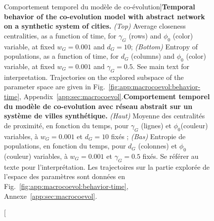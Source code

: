 \begin{figure}
\caption[Temporal behavior of the co-evolution model][Comportement temporel du modèle de co-évolution]{\textbf{Temporal behavior of the co-evolution model with abstract network on a synthetic system of cities.} \textit{(Top)} Average closeness centralities, as a function of time, for $\gamma_G$ (rows) and $\phi_0$ (color) variable, at fixed $w_G = 0.001$ and $d_G = 10$; \textit{(Bottom)} Entropy of populations, as a function of time, for $d_G$ (columns) and $\phi_0$ (color) variable, at fixed $w_G = 0.001$ and $\gamma_G = 0.5$. See main text for interpretation. Trajectories on the explored subspace of the parameter space are given in Fig.~\ref{fig:app:macrocoevol:behavior-time}, Appendix~\ref{app:sec:macrocoevol}.\label{fig:macrocoevol:behavior-time}}{\textbf{Comportement temporel du modèle de co-evolution avec réseau abstrait sur un système de villes synthétique.} \textit{(Haut)} Moyenne des centralités de proximité, en fonction du temps, pour $\gamma_G$ (lignes) et $\phi_0$(couleur) variables, à $w_G = 0.001$ et $d_G = 10$ fixés ; \textit{(Bas)} Entropie de populations, en fonction du temps, pour $d_G$ (colonnes) et $\phi_0$ (couleur) variables, à $w_G = 0.001$ et $\gamma_G = 0.5$ fixés. Se référer au texte pour l'interprétation. Les trajectoires sur la partie explorée de l'espace des paramètres sont données en Fig.~\ref{fig:app:macrocoevol:behavior-time}, Annexe~\ref{app:sec:macrocoevol}.\label{fig:macrocoevol:behavior-time}}
\end{figure}




